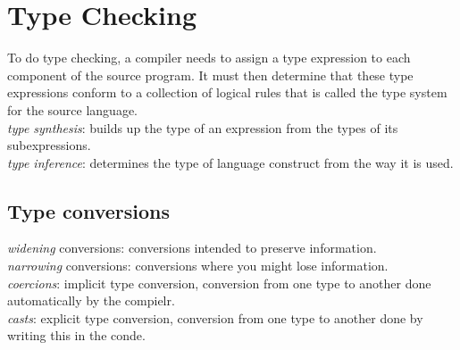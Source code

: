 \section{Type Checking}
To do type checking, a compiler needs to assign a type expression to each component of the source program. It must then determine that these type expressions conform to a collection of logical rules that is called the type system for the source language. \\
\emph{type synthesis}: builds up the type of an expression from the types of its subexpressions. \\
\emph{type inference}: determines the type of language construct from the way it is used. \\

\subsection{Type conversions}
\emph{widening} conversions: conversions intended to preserve information. \\
\emph{narrowing} conversions: conversions where you might lose information. \\

\emph{coercions}: implicit type conversion, conversion from one type to another done automatically by the compielr. \\
\emph{casts}: explicit type conversion, conversion from one type to another done by writing this in the conde. \\
 

